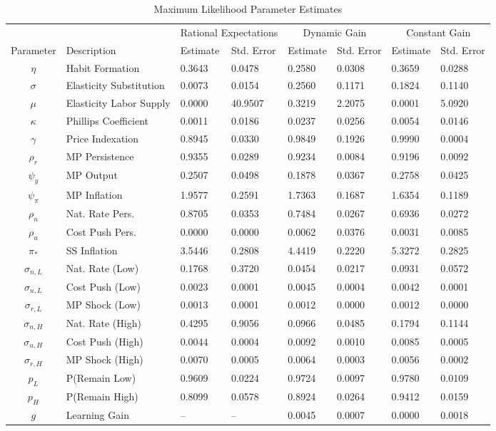 \begin{sidewaystable}\caption{Maximum Likelihood Parameter Estimates}\label{tb3:parms}\vspace{2pc}\hspace{4pc}
\begin{tabular}{|c|l|ll|ll|ll|}\hline
 & & \multicolumn{2}{|c|}{Rational Expectations} & \multicolumn{2}{|c|}{Dynamic Gain} & \multicolumn{2}{|c|}{Constant Gain} \\ 
Parameter & Description & Estimate & Std. Error & Estimate & Std. Error & Estimate & Std. Error \\ \hline 
$\eta$ & Habit Formation & 0.3643 & 0.0478 & 0.2580 & 0.0308 & 0.3659 & 0.0288 \\ 
$\sigma$ & Elasticity Substitution & 0.0073 & 0.0154 & 0.2560 & 0.1171 & 0.1824 & 0.1140 \\ 
$\mu$ & Elasticity Labor Supply & 0.0000 & 40.9507 & 0.3219 & 2.2075 & 0.0001 & 5.0920 \\ 
$\kappa$ & Phillips Coefficient & 0.0011 & 0.0186 & 0.0237 & 0.0256 & 0.0054 & 0.0146 \\ 
$\gamma$ & Price Indexation & 0.8945 & 0.0330 & 0.9849 & 0.1926 & 0.9990 & 0.0004 \\ 
$\rho_r$ & MP Persistence & 0.9355 & 0.0289 & 0.9234 & 0.0084 & 0.9196 & 0.0092 \\ 
$\psi_y$ & MP Output & 0.2507 & 0.0498 & 0.1878 & 0.0367 & 0.2758 & 0.0425 \\ 
$\psi_{\pi}$ & MP Inflation & 1.9577 & 0.2591 & 1.7363 & 0.1687 & 1.6354 & 0.1189 \\ 
$\rho_{n}$ & Nat. Rate Pers.& 0.8705 & 0.0353 & 0.7484 & 0.0267 & 0.6936 & 0.0272 \\ 
$\rho_{u}$ & Cost Push Pers.& 0.0000 & 0.0000 & 0.0062 & 0.0376 & 0.0031 & 0.0085 \\ 
$\pi_{*}$ & SS Inflation & 3.5446 & 0.2808 & 4.4419 & 0.2220 & 5.3272 & 0.2825 \\ 
$\sigma_{n,L}$ & Nat. Rate (Low)& 0.1768 & 0.3720 & 0.0454 & 0.0217 & 0.0931 & 0.0572 \\ 
$\sigma_{u,L}$ & Cost Push (Low)& 0.0023 & 0.0001 & 0.0045 & 0.0004 & 0.0042 & 0.0001 \\ 
$\sigma_{r,L}$ & MP Shock (Low)& 0.0013 & 0.0001 & 0.0012 & 0.0000 & 0.0012 & 0.0000 \\ 
$\sigma_{n,H}$ & Nat. Rate (High)& 0.4295 & 0.9056 & 0.0966 & 0.0485 & 0.1794 & 0.1144 \\ 
$\sigma_{u,H}$ & Cost Push (High)& 0.0044 & 0.0004 & 0.0092 & 0.0010 & 0.0085 & 0.0005 \\ 
$\sigma_{r,H}$ & MP Shock (High)& 0.0070 & 0.0005 & 0.0064 & 0.0003 & 0.0056 & 0.0002 \\ 
$p_{L}$ & P(Remain Low) & 0.9609 & 0.0224 & 0.9724 & 0.0097 & 0.9780 & 0.0109 \\ 
$p_{H}$ & P(Remain High) & 0.8099 & 0.0578 & 0.8924 & 0.0264 & 0.9412 & 0.0159 \\ 
$g$ & Learning Gain & -- & -- & 0.0045 & 0.0007 & 0.0000 & 0.0018 \\ \hline 
\end{tabular}
\end{sidewaystable}
